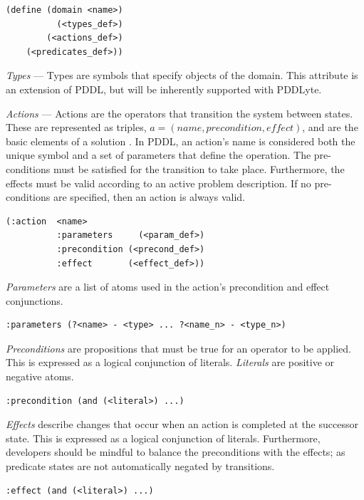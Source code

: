 \documentclass[
a4paper, %
11pt, %
onecolumn, %
openany, %
]{memoir}
\begin{document}
{\begin{lstlisting}
(define (domain <name>)
          (<types_def>)
        (<actions_def>)
    (<predicates_def>))
\end{lstlisting}

\textit{Types} --- Types are symbols that specify objects of the domain. This attribute is an extension of PDDL, but will be inherently supported with PDDLyte.

\textit{Actions} --- Actions are the operators that transition the system between states. These are represented as triples, $a = (name, precondition, effect)$, and are the basic elements of a solution \cite{strips70}. In PDDL, an action's name is considered both the unique symbol and a set of parameters that define the operation. The pre-conditions must be satisfied for the transition to take place. Furthermore, the effects must be valid according to an active problem description. If no pre-conditions are specified, then an action is always valid. 

\begin{lstlisting}
(:action  <name>
          :parameters     (<param_def>)
          :precondition (<precond_def>)
          :effect       (<effect_def>))
\end{lstlisting}

\textit{Parameters} are a list of atoms used in the action's precondition and effect conjunctions.

\begin{lstlisting}
:parameters (?<name> - <type> ... ?<name_n> - <type_n>)
\end{lstlisting}

\textit{Preconditions} are propositions that must be true for an operator to be applied. This is expressed as a logical conjunction of literals. \textit{Literals} are positive or negative atoms.

\begin{lstlisting}
:precondition (and (<literal>) ...)
\end{lstlisting}

\textit{Effects} describe changes that occur when an action is completed at the successor state. This is expressed as a logical conjunction of literals. Furthermore, developers should be mindful to balance the preconditions with the effects; as predicate states are not automatically negated by transitions.

\begin{lstlisting}
:effect (and (<literal>) ...)
\end{lstlisting}

}
\end{document}
